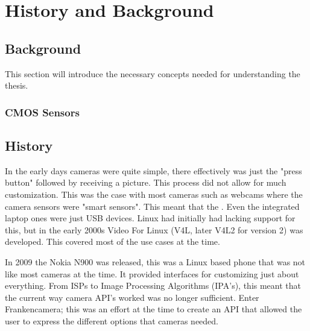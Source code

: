 \chapter{History and Background\label{history}}
\section{Background}
This section will introduce the necessary concepts needed for understanding the
thesis.

\subsection{CMOS Sensors}


\section{History}
In the early days cameras were quite simple, there effectively was just the
"press button" followed by receiving a picture. This process did not allow for
much customization. This was the case with most cameras such as webcams where
the camera sensors were "smart sensors". This meant that the . Even the
integrated laptop ones were just USB devices. Linux had initially had lacking
support for this, but in the early 2000s Video For Linux (V4L, later V4L2 for
version 2) was developed. This covered most of the use cases at the time.

In 2009 the Nokia N900 was released, this was a Linux based phone that was not
like most cameras at the time. It provided interfaces for customizing just
about everything. From ISPs to Image Processing Algorithms (IPA's), this meant
that the current way camera API's worked was no longer sufficient. Enter
Frankencamera\cite{adams2010frankencamera}; this was an effort at the time
to create an API that allowed the user to express the different options that
cameras needed.

